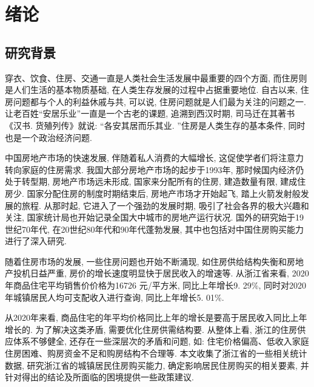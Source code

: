 \documentclass[a4paper, 12pt, twoside]{ctexart}
\begin{document}
\newpage %
\pagestyle{empty}
\tableofcontents      %
\newpage %
\newpage
\section{绪论}
    \subsection{研究背景}
  穿衣、饮食、住房、交通一直是人类社会生活发展中最重要的四个方面, 而住房则是人们生活的基本物质基础, 在人类生存发展的过程中占据重要地位. 自古以来, 住房问题都与个人的利益休戚与共, 可以说, 住房问题就是人们最为关注的问题之一. 让老百姓“安居乐业”一直是一个古老的课题, 追溯到西汉时期, 司马迁在其著书《汉书. 货殖列传》就说: “各安其居而乐其业. ”住房是人类生存的基本条件, 同时也是一个政治经济问题.

  中国房地产市场的快速发展, 伴随着私人消费的大幅增长, 这促使学者们将注意力转向家庭的住房需求. 我国大部分房地产市场的起步于1993年, 那时候国内经济仍处于转型期, 房地产市场远未形成, 国家来分配所有的住房, 建造数量有限, 建成住房少. 国家分配住房的制度时期结束后, 房地产市场才开始起飞, 踏上火箭发射般发展的旅程.  从那时起, 它进入了一个强劲的发展时期, 吸引了社会各界的极大兴趣和关注, 国家统计局也开始记录全国大中城市的房地产运行状况. 国外的研究始于19世纪70年代, 在20世纪80年代和90年代蓬勃发展, 其中也包括对中国住房购买能力进行了深入研究.

  随着住房市场的发展, 一些住房问题也开始不断涌现, 如住房供给结构失衡和房地产投机日益严重, 房价的增长速度明显快于居民收入的增速等. 从浙江省来看, 2020年商品住宅平均销售价价格为16726 元/平方米, 同比上年增长9. 29\%, 同时对2020 年城镇居民人均可支配收入进行查询, 同比上年增长5. 01\%.

   从2020年来看, 商品住宅的年平均价格同比上年的增长是要高于居民收入同比上年增长的. 为了解决这类矛盾, 需要优化住房供需结构要. 从整体上看, 浙江的住房供应体系不够健全, 还存在一些深层次的矛盾和问题, 如: 住宅价格偏高、低收入家庭住房困难、购房资金不足和购房结构不合理等. 本文收集了浙江省的一些相关统计数据, 研究浙江省的城镇居民住房购买能力, 确定影响居民住房购买的相关要素, 并针对得出的结论及所面临的困境提供一些政策建议.
\end{document}
